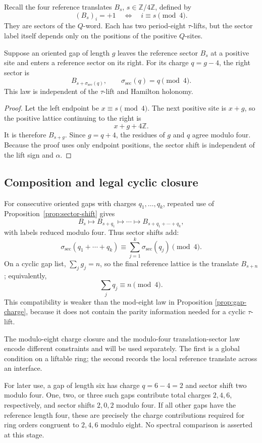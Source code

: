 Recall the four reference translates \(B_s\), \(s\in\mathbb Z/4\mathbb Z\),
defined by
\[
(B_s)_i=+1\quad\Longleftrightarrow\quad i\equiv s\pmod4.
\]
They are sectors of the \(Q\)-word.  Each has two period-eight
\(\tau\)-lifts, but the sector label itself depends only on the positions of
the positive \(Q\)-sites.

\begin{proposition}\label{prop:sector-shift}
Suppose an oriented gap of length \(g\) leaves the reference sector \(B_s\)
at a positive site and enters a reference sector on its right.  For its
charge \(q=g-4\), the right sector is
\[
B_{s+\sigma_{\mathrm{sec}}(q)},\qquad
\sigma_{\mathrm{sec}}(q)=q\pmod4.
\]
This law is independent of the \(\tau\)-lift and Hamilton holonomy.
\end{proposition}

\begin{proof}
Let the left endpoint be \(x\equiv s\pmod4\).  The next positive site is
\(x+g\), so the positive lattice continuing to the right is
\[
x+g+4\mathbb Z.
\]
It is therefore \(B_{s+g}\). Since \(g=q+4\), the residues of \(g\) and
\(q\) agree modulo four. Because the proof uses only endpoint positions, the
sector shift is independent of the lift sign and \(\alpha\).
\end{proof}

\subsection{Composition and legal cyclic closure}
\label{subsec:composition-legal-cyclic-closure}

For consecutive oriented gaps with charges \(q_1,\ldots,q_k\), repeated use
of Proposition~\ref{prop:sector-shift} gives
\[
B_s\longmapsto B_{s+q_1}\longmapsto\cdots\longmapsto
B_{s+q_1+\cdots+q_k},
\]
with labels reduced modulo four.  Thus sector shifts add:
\[
\sigma_{\mathrm{sec}}(q_1+\cdots+q_k)
\equiv\sum_{j=1}^k\sigma_{\mathrm{sec}}(q_j)\pmod4.
\]
On a cyclic gap list, \(\sum_jg_j=n\), so the final reference lattice is
the translate \(B_{s+n}\); equivalently,
\[
\sum_jq_j\equiv n\pmod4.
\]
This compatibility is weaker than the mod-eight law in Proposition
\ref{prop:gap-charge}, because it does not contain the parity information
needed for a cyclic \(\tau\)-lift.

The modulo-eight charge closure and the modulo-four translation-sector law
encode different constraints and will be used separately.  The first is a
global condition on a liftable ring; the second records the local reference
translate across an interface.

For later use, a gap of length six has charge \(q=6-4=2\) and sector shift
two modulo four.  One, two, or three such gaps contribute total charges
\(2,4,6\), respectively, and sector shifts \(2,0,2\) modulo four.  If all
other gaps have the reference length four, these are precisely the charge
contributions required for ring orders congruent to \(2,4,6\) modulo eight.
No spectral comparison is asserted at this stage.
